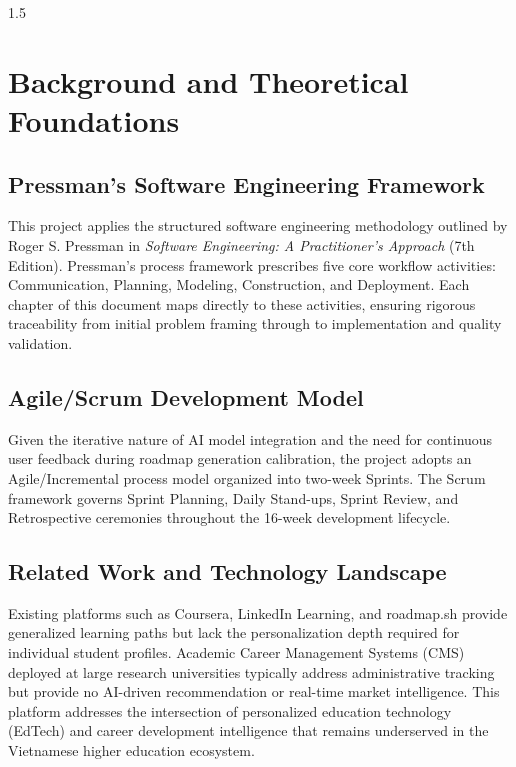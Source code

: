 \documentclass[12pt,a4paper]{report}
\begin{document}
\begin{spacing}{1.5}
		\section{Background and Theoretical Foundations}
		
		\subsection{Pressman's Software Engineering Framework}
		
		This project applies the structured software engineering methodology outlined by Roger S. Pressman in \textit{Software Engineering: A Practitioner's Approach} (7th Edition). Pressman's process framework prescribes five core workflow activities: Communication, Planning, Modeling, Construction, and Deployment. Each chapter of this document maps directly to these activities, ensuring rigorous traceability from initial problem framing through to implementation and quality validation.
		
		\subsection{Agile/Scrum Development Model}
		
		Given the iterative nature of AI model integration and the need for continuous user feedback during roadmap generation calibration, the project adopts an Agile/Incremental process model organized into two-week Sprints. The Scrum framework governs Sprint Planning, Daily Stand-ups, Sprint Review, and Retrospective ceremonies throughout the 16-week development lifecycle.
		
		\subsection{Related Work and Technology Landscape}
		
		Existing platforms such as Coursera, LinkedIn Learning, and roadmap.sh provide generalized learning paths but lack the personalization depth required for individual student profiles. Academic Career Management Systems (CMS) deployed at large research universities typically address administrative tracking but provide no AI-driven recommendation or real-time market intelligence. This platform addresses the intersection of personalized education technology (EdTech) and career development intelligence that remains underserved in the Vietnamese higher education ecosystem.
		

\end{spacing}
\end{document}
